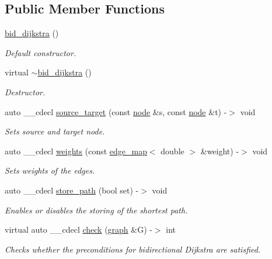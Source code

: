 \subsection*{Public Member Functions}
\begin{DoxyCompactItemize}
\item 
\mbox{\hyperlink{classbid__dijkstra_a1f9ddd95b88b24f45afe0966c2ae181b}{bid\+\_\+dijkstra}} ()
\begin{DoxyCompactList}\small\item\em Default constructor. \end{DoxyCompactList}\item 
virtual \mbox{\hyperlink{classbid__dijkstra_a3d46b327a3a87ac874e3930227a13757}{$\sim$bid\+\_\+dijkstra}} ()
\begin{DoxyCompactList}\small\item\em Destructor. \end{DoxyCompactList}\item 
auto \+\_\+\+\_\+cdecl \mbox{\hyperlink{classbid__dijkstra_a8f9cf576f64dbb4540655d4625930422}{source\+\_\+target}} (const \mbox{\hyperlink{classnode}{node}} \&s, const \mbox{\hyperlink{classnode}{node}} \&t) -\/$>$ void
\begin{DoxyCompactList}\small\item\em Sets source and target node. \end{DoxyCompactList}\item 
auto \+\_\+\+\_\+cdecl \mbox{\hyperlink{classbid__dijkstra_a7f077bb3c17567414bec7d733bb7daec}{weights}} (const \mbox{\hyperlink{classedge__map}{edge\+\_\+map}}$<$ double $>$ \&weight) -\/$>$ void
\begin{DoxyCompactList}\small\item\em Sets weights of the edges. \end{DoxyCompactList}\item 
auto \+\_\+\+\_\+cdecl \mbox{\hyperlink{classbid__dijkstra_aa095beede9c50b1f1e482049a2a4b619}{store\+\_\+path}} (bool set) -\/$>$ void
\begin{DoxyCompactList}\small\item\em Enables or disables the storing of the shortest path. \end{DoxyCompactList}\item 
virtual auto \+\_\+\+\_\+cdecl \mbox{\hyperlink{classbid__dijkstra_a908a240370d578fbd6bf54b4ab09d391}{check}} (\mbox{\hyperlink{classgraph}{graph}} \&G) -\/$>$ int
\begin{DoxyCompactList}\small\item\em Checks whether the preconditions for bidirectional Dijkstra are satisfied. \end{DoxyCompactList}\item 

\end{DoxyCompactItemize}
